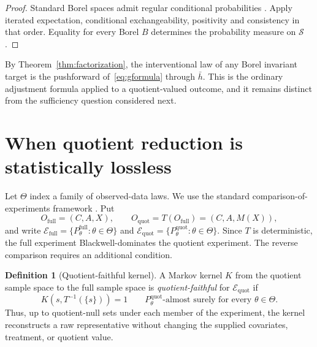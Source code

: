 \documentclass[11pt]{article}
\theoremstyle{plain}
\theoremstyle{definition}
\newtheorem{definition}[theorem]{Definition}
\numberwithin{equation}{section}
\newcommand{\1}{\mathbf 1}
\newcommand{\calE}{\mathcal E}
\newcommand{\calS}{\mathcal S}
\newcommand{\full}{\mathrm{full}}
\newcommand{\quot}{\mathrm{quot}}
\begin{document}
\begin{proof}
Standard Borel spaces admit regular conditional probabilities \citep{Kallenberg2021}. Apply iterated expectation, conditional exchangeability, positivity and consistency in that order. Equality for every Borel $B$ determines the probability measure on $\calS$.
\end{proof}

By Theorem~\ref{thm:factorization}, the interventional law of any Borel invariant target is the pushforward of~\eqref{eq:gformula} through $\bar h$. This is the ordinary adjustment formula \citep{Robins1986,RosenbaumRubin1983} applied to a quotient-valued outcome, and it remains distinct from the sufficiency question considered next.

\section{When quotient reduction is statistically lossless}\label{sec:lossless}

Let $\Theta$ index a family of observed-data laws. We use the standard comparison-of-experiments framework \citep{LeCam1986,Torgersen1991}. Put
\[
O_{\full}=(C,A,X),\qquad O_{\quot}=T(O_{\full})=(C,A,M(X)),
\]
and write $\calE_{\full}=\{P_\theta^{\full}:\theta\in\Theta\}$ and $\calE_{\quot}=\{P_\theta^{\quot}:\theta\in\Theta\}$. Since $T$ is deterministic, the full experiment Blackwell-dominates the quotient experiment. The reverse comparison requires an additional condition.

\begin{definition}[Quotient-faithful kernel]
	A Markov kernel \(K\) from the quotient sample space to the full sample space
	is \emph{quotient-faithful} for \(\calE_{\quot}\) if
	\[
	K\!\left(s,T^{-1}(\{s\})\right)=1
	\qquad
	P_\theta^{\quot}\text{-almost surely for every }\theta\in\Theta.
	\]
	Thus, up to quotient-null sets under each member of the experiment, the kernel
	reconstructs a raw representative without changing the supplied covariates,
	treatment, or quotient value.
\end{definition}
\end{document}
